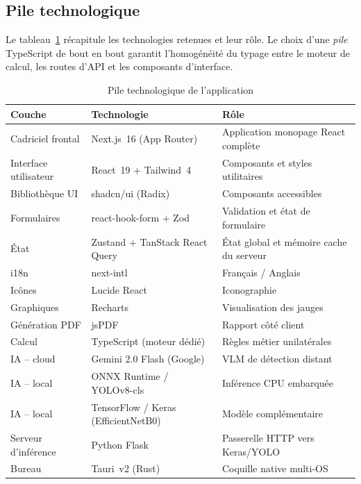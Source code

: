 \subsection{Pile technologique}
\label{sec:stack}

Le tableau~\ref{tab:stack} récapitule les technologies retenues et leur
rôle. Le choix d'une \emph{pile} TypeScript de bout en bout garantit
l'homogénéité du typage entre le moteur de calcul, les routes d'API et
les composants d'interface.

\begin{table}[H]
\centering
\caption{Pile technologique de l'application}
\label{tab:stack}
\small
\begin{tabular}{@{}p{4.2cm} p{3.8cm} p{6.5cm}@{}}
\toprule
\bfseries Couche & \bfseries Technologie & \bfseries Rôle \\
\midrule
Cadriciel frontal & Next.js~16 (App Router) & Application monopage React complète \\
\addlinespace
Interface utilisateur & React~19 + Tailwind~4 & Composants et styles
utilitaires \\
\addlinespace
Bibliothèque UI & shadcn/ui (Radix) & Composants accessibles \\
\addlinespace
Formulaires & react-hook-form + Zod & Validation et état de
formulaire \\
\addlinespace
État & Zustand + TanStack React Query & État global et mémoire cache du serveur
\\
\addlinespace
i18n & next-intl & Français / Anglais \\
\addlinespace
Icônes & Lucide React & Iconographie \\
\addlinespace
Graphiques & Recharts & Visualisation des jauges \\
\addlinespace
Génération PDF & jsPDF & Rapport côté client \\
\addlinespace
Calcul \cttp{} & TypeScript (moteur dédié) & Règles métier
unilatérales \\
\addlinespace
IA -- cloud & Gemini 2.0 Flash (Google) & VLM de détection
distant \\
\addlinespace
IA -- local & ONNX Runtime / YOLOv8-cls & Inférence CPU embarquée
\\
\addlinespace
IA -- local & TensorFlow / Keras (EfficientNetB0) & Modèle
complémentaire \\
\addlinespace
Serveur d'inférence & Python Flask & Passerelle HTTP vers Keras/YOLO \\
\addlinespace
Bureau & Tauri~v2 (Rust) & Coquille native multi-OS \\
\bottomrule
\end{tabular}
\end{table}

